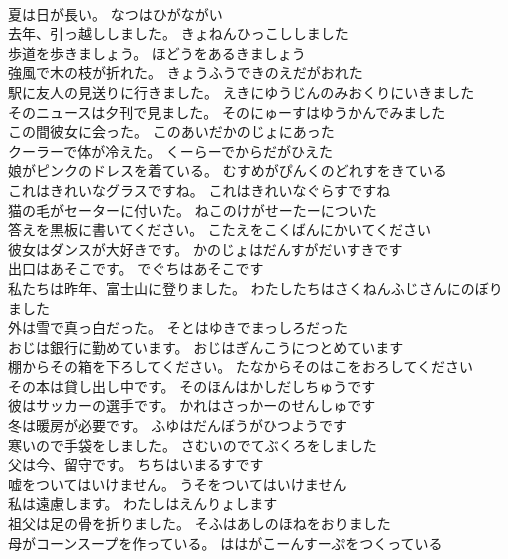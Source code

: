 \documentclass[8pt]{extreport}
\begin{document}
\begin{CJK}{UTF8}{min}
\\	夏は日が長い。	なつはひがながい 
\\	去年、引っ越ししました。	きょねんひっこししました 
\\	歩道を歩きましょう。	ほどうをあるきましょう 
\\	強風で木の枝が折れた。	きょうふうできのえだがおれた 
\\	駅に友人の見送りに行きました。	えきにゆうじんのみおくりにいきました 
\\	そのニュースは夕刊で見ました。	そのにゅーすはゆうかんでみました 
\\	この間彼女に会った。	このあいだかのじょにあった 
\\	クーラーで体が冷えた。	くーらーでからだがひえた 
\\	娘がピンクのドレスを着ている。	むすめがぴんくのどれすをきている 
\\	これはきれいなグラスですね。	これはきれいなぐらすですね 
\\	猫の毛がセーターに付いた。	ねこのけがせーたーについた 
\\	答えを黒板に書いてください。	こたえをこくばんにかいてください 
\\	彼女はダンスが大好きです。	かのじょはだんすがだいすきです 
\\	出口はあそこです。	でぐちはあそこです 
\\	私たちは昨年、富士山に登りました。	わたしたちはさくねんふじさんにのぼりました 
\\	外は雪で真っ白だった。	そとはゆきでまっしろだった 
\\	おじは銀行に勤めています。	おじはぎんこうにつとめています 
\\	棚からその箱を下ろしてください。	たなからそのはこをおろしてください 
\\	その本は貸し出し中です。	そのほんはかしだしちゅうです 
\\	彼はサッカーの選手です。	かれはさっかーのせんしゅです 
\\	冬は暖房が必要です。	ふゆはだんぼうがひつようです 
\\	寒いので手袋をしました。	さむいのでてぶくろをしました 
\\	父は今、留守です。	ちちはいまるすです 
\\	嘘をついてはいけません。	うそをついてはいけません 
\\	私は遠慮します。	わたしはえんりょします 
\\	祖父は足の骨を折りました。	そふはあしのほねをおりました 
\\	母がコーンスープを作っている。	ははがこーんすーぷをつくっている 

\end{CJK}
\end{document}
